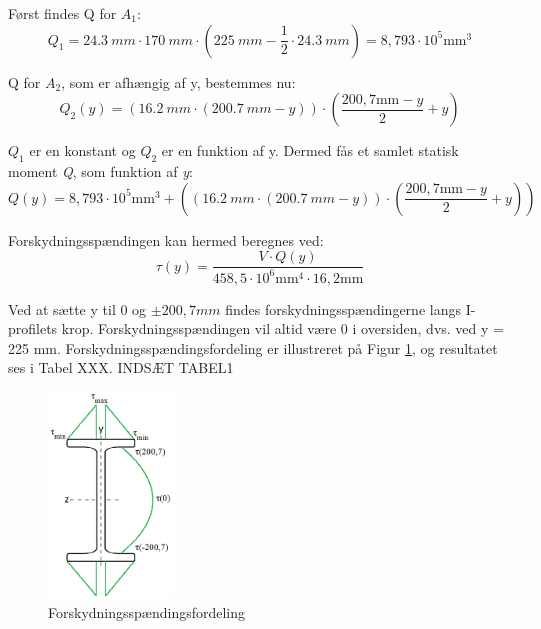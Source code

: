 Først findes Q for $A_1$:
\begin{equation}
	Q_1 = \SI{24,3}{mm} \cdot \SI{170}{mm} \cdot (\SI{225}{mm} - \frac{1}{2} \cdot \SI{24,3}{mm}) = 8,\!793 \cdot 10^5 \text{mm}^3
\end{equation}

Q for $A_2$, som er afhængig af y, bestemmes nu:
\begin{equation}
Q_2(y) = (\SI{16,2}{mm} \cdot (\SI{200,7}{mm} -y)) \cdot (\frac{200\!,7 \text{mm} -y}{2} + y)
\end{equation}

$Q_1$ er en konstant og $Q_2$ er en funktion af y. Dermed fås et samlet statisk moment \textit{Q}, som funktion af \textit{y}:
\begin{equation}
	Q(y) = 8,\!793 \cdot 10^5 \text{mm}^3 + ((\SI{16,2}{mm} \cdot (\SI{200,7}{mm} -y)) \cdot (\frac{200\!,7 \text{mm} -y}{2} + y))
\end{equation}

Forskydningsspændingen kan hermed beregnes ved:
\begin{equation}
	\tau(y) = \frac{V \cdot Q(y)}{458,\!5 \cdot 10^6 \text{mm}^4 \cdot 16,\!2 \text{mm}}
\end{equation}

Ved at sætte y til 0 og $\pm 200,7 mm$ findes forskydningsspændingerne langs I-profilets krop. Forskydningsspændingen vil altid være 0 i oversiden, dvs. ved y = 225 mm. Forskydningsspændingsfordeling er illustreret på Figur \ref{fig:forskydfordeling}, og resultatet ses i Tabel XXX.  
\newline
\newline
INDSÆT TABEL1

\begin{figure}[H]
	\centering
	\includegraphics[width=0.3\textwidth]{billeder/forskydningsfordeling.png}
	\caption{Forskydningsspændingsfordeling}
	\label{fig:forskydfordeling}
\end{figure}

